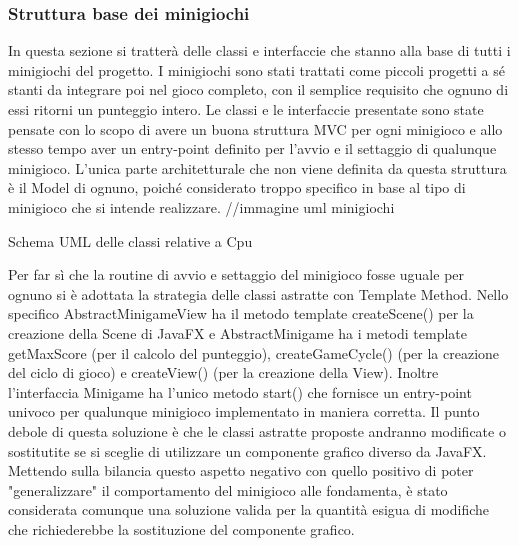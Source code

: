 \documentclass[a4paper,12pt]{report}
\begin{document}
	\subsubsection{Struttura base dei minigiochi}
	In questa sezione si tratterà delle classi e interfaccie che stanno alla base di tutti i minigiochi del progetto.\newline
	\newline
	I minigiochi sono stati trattati come piccoli progetti a sé stanti da integrare poi nel gioco completo, con il semplice requisito che ognuno di essi ritorni un punteggio intero.\newline
	Le classi e le interfaccie presentate sono state pensate con lo scopo di avere un buona struttura MVC per ogni minigioco e allo stesso tempo aver un entry-point definito per l'avvio e il settaggio di qualunque minigioco. L'unica parte architetturale che non viene definita da questa struttura è il Model di ognuno, poiché considerato troppo specifico in base al tipo di minigioco che si intende realizzare.\newline
	//immagine uml minigiochi\newline
	\caption{Schema UML delle classi relative a Cpu}
	Per far sì che la routine di avvio e settaggio del minigioco fosse uguale per ognuno si è adottata la strategia delle classi astratte con Template Method.
	Nello specifico AbstractMinigameView ha il metodo template createScene() per la creazione della Scene di JavaFX e AbstractMinigame ha i metodi template getMaxScore (per il calcolo del punteggio), createGameCycle() (per la creazione del ciclo di gioco) e createView() (per la creazione della View).\newline
	Inoltre l'interfaccia Minigame ha l'unico metodo start() che fornisce un entry-point univoco per qualunque minigioco implementato in maniera corretta.\newline
	\newline
	Il punto debole di questa soluzione è che le classi astratte proposte andranno modificate o sostitutite se si sceglie di utilizzare un componente grafico diverso da JavaFX. Mettendo sulla bilancia questo aspetto negativo con quello positivo di poter "generalizzare" il comportamento del minigioco alle fondamenta, è stato considerata comunque una soluzione valida per la quantità esigua di modifiche che richiederebbe la sostituzione del componente grafico.
\end{document}
